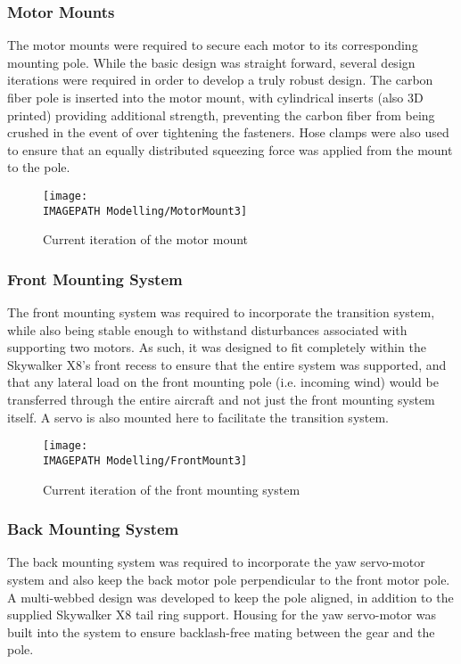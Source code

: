 \subsubsection*{Motor Mounts}
The motor mounts were required to secure each motor to its corresponding mounting pole. While the basic design was straight forward, several design iterations were required in order to develop a truly robust design. The carbon fiber pole is inserted into the motor mount, with cylindrical inserts (also 3D printed) providing additional strength, preventing the carbon fiber from being crushed in the event of over tightening the fasteners. Hose clamps were also used to ensure that an equally distributed squeezing force was applied from the mount to the pole.

\begin{figure}[!ht]
	\centering
	\texttt{[image: \\IMAGEPATH Modelling/MotorMount3]}
	\caption{Current iteration of the motor mount}
	\label{fig:designmotormount}
\end{figure}
	
\subsubsection*{Front Mounting System}
The front mounting system was required to incorporate the transition system, while also being stable enough to withstand disturbances associated with supporting two motors. As such, it was designed to fit completely within the Skywalker X8's front recess to ensure that the entire system was supported, and that any lateral load on the front mounting pole (i.e. incoming wind) would be transferred through the entire aircraft and not just the front mounting system itself. A servo is also mounted here to facilitate the transition system.

\begin{figure}[!ht]
	\centering
	\texttt{[image: \\IMAGEPATH Modelling/FrontMount3]}
	\caption{Current iteration of the front mounting system}
	\label{fig:designfrontmount}
\end{figure}
	
\subsubsection*{Back Mounting System}
The back mounting system was required to incorporate the yaw servo-motor system and also keep the back motor pole perpendicular to the front motor pole. A multi-webbed design was developed to keep the pole aligned, in addition to the supplied Skywalker X8 tail ring support. Housing for the yaw servo-motor was built into the system to ensure backlash-free mating between the gear and the pole.\\

